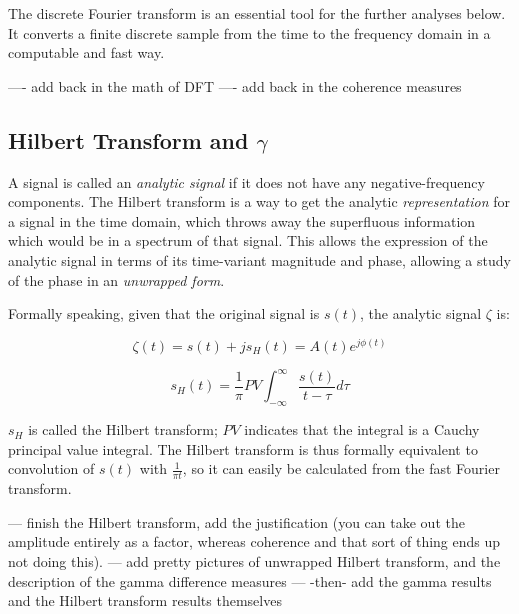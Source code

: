 \documentclass[12pt]{article}
\begin{document}
The discrete Fourier transform is an essential tool for the further analyses below. It converts a finite discrete sample from the time to the frequency domain in a computable and fast way.

---- add back in the math of DFT
---- add back in the coherence measures




\subsection{Hilbert Transform and $\gamma$}

A signal is called an \emph{analytic signal} if it does not have any negative-frequency components. The Hilbert transform is a way to get the analytic \emph{representation} for a signal in the time domain, which throws away the superfluous information which would be in a spectrum of that signal. This allows the expression of the analytic signal in terms of its time-variant magnitude and phase, allowing a study of the phase in an \emph{unwrapped form}\cite{gabor}.

Formally speaking, given that the original signal is $s(t)$, the analytic signal $\zeta$ is:

$$\zeta(t) = s(t) + js_H(t) = A(t)e^{j\phi(t)}$$

$$s_H(t) = \frac{1}{\pi} PV \int_{-\infty}^{\infty} \frac{s(t)}{t - \tau} d\tau$$

$s_H$ is called the Hilbert transform; $PV$ indicates that the integral is a Cauchy principal value integral. The Hilbert transform is thus formally equivalent to convolution of $s(t)$ with $\frac{1}{\pi t}$, so it can easily be calculated from the fast Fourier transform.

--- finish the Hilbert transform, add the justification (you can take out the amplitude entirely as a factor, whereas coherence and that sort of thing ends up not doing this).
--- add pretty pictures of unwrapped Hilbert transform, and the description of the gamma difference measures
--- -then- add the gamma results and the Hilbert transform results themselves
\end{document}
